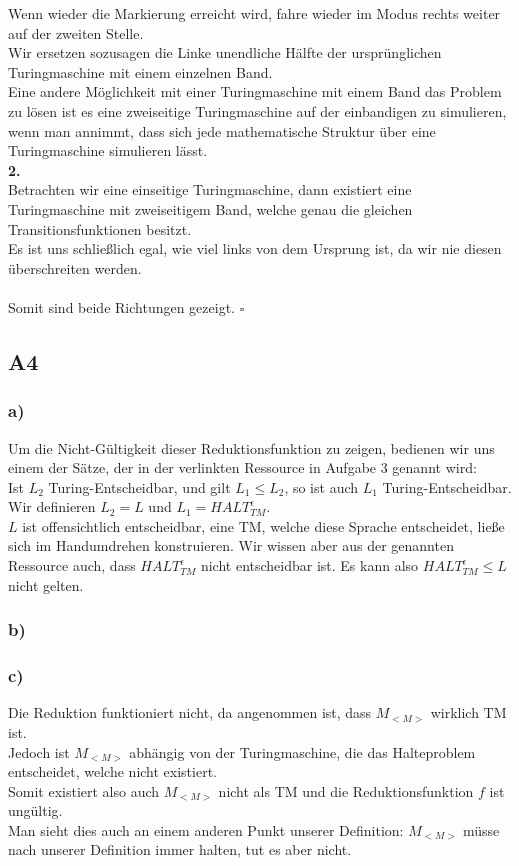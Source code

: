 \documentclass[12pt, a4paper]{article}
\newcommand*{\qed}{\null\nobreak\hfill\ensuremath{\square}}
\begin{document}
Wenn wieder die Markierung erreicht wird, fahre wieder im  Modus rechts weiter auf der zweiten Stelle. \\
Wir ersetzen sozusagen die Linke unendliche Hälfte der ursprünglichen Turingmaschine mit einem einzelnen Band. \\
Eine andere Möglichkeit mit einer Turingmaschine mit einem Band das Problem zu lösen ist es eine zweiseitige Turingmaschine auf der einbandigen zu simulieren, wenn man annimmt, dass sich jede mathematische Struktur über eine Turingmaschine simulieren lässt.\\
\textbf{2. } \textquote{\(\Leftarrow\)} \\
Betrachten wir eine einseitige Turingmaschine, dann existiert eine Turingmaschine mit zweiseitigem Band, welche genau die gleichen Transitionsfunktionen besitzt. \\
Es ist uns schließlich egal, wie viel  links von dem Ursprung ist, da wir nie diesen überschreiten werden. \\
\\
Somit sind beide Richtungen gezeigt. \qed
\subsection*{A4}
\subsubsection*{a)}
Um die Nicht-Gültigkeit dieser Reduktionsfunktion zu zeigen, bedienen wir uns einem der Sätze, 
der in der verlinkten Ressource in Aufgabe 3 genannt wird: \\
Ist \(L_2\) Turing-Entscheidbar, und gilt \(L_1 \leq L_2\), so ist auch \(L_1\) Turing-Entscheidbar. \\
Wir definieren \(L_2 = L\) und \(L_1 = HALT_{TM}^{\epsilon}\).\\
\(L\) ist offensichtlich entscheidbar, eine TM, welche diese Sprache entscheidet, ließe sich 
im Handumdrehen konstruieren. Wir wissen aber aus der genannten Ressource auch, dass 
\(HALT_{TM}^{\epsilon}\) nicht entscheidbar ist. Es kann also \(HALT_{TM}^{\epsilon} \leq L\) 
nicht gelten.
\subsubsection*{b)}
\subsubsection*{c)}
Die Reduktion funktioniert nicht, da angenommen ist, dass \(M_{<M>}\) wirklich TM ist. \\
Jedoch ist \(M_{<M>}\) abhängig von der Turingmaschine, die das Halteproblem entscheidet, welche nicht existiert. \\
Somit existiert also auch \(M_{<M>}\) nicht als TM und die Reduktionsfunktion \(f\) ist ungültig. \\
Man sieht dies auch an einem anderen Punkt unserer Definition: \(M_{<M>}\) müsse nach unserer Definition immer halten, tut es aber nicht.
\end{document}
